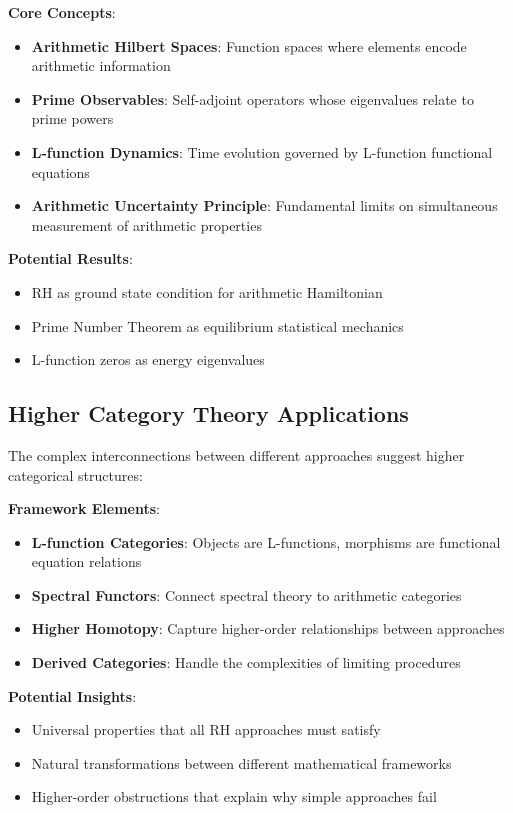 \begin{framework}
\textbf{Core Concepts}:
\begin{itemize}
\item \textbf{Arithmetic Hilbert Spaces}: Function spaces where elements encode arithmetic information
\item \textbf{Prime Observables}: Self-adjoint operators whose eigenvalues relate to prime powers
\item \textbf{L-function Dynamics}: Time evolution governed by L-function functional equations
\item \textbf{Arithmetic Uncertainty Principle}: Fundamental limits on simultaneous measurement of arithmetic properties
\end{itemize}

\textbf{Potential Results}:
\begin{itemize}
\item RH as ground state condition for arithmetic Hamiltonian
\item Prime Number Theorem as equilibrium statistical mechanics
\item L-function zeros as energy eigenvalues
\end{itemize}
\end{framework}

\subsection{Higher Category Theory Applications}
\label{subsec:higher_category}

The complex interconnections between different approaches suggest higher categorical structures:

\begin{research_direction}
\textbf{Framework Elements}:
\begin{itemize}
\item \textbf{L-function Categories}: Objects are L-functions, morphisms are functional equation relations
\item \textbf{Spectral Functors}: Connect spectral theory to arithmetic categories
\item \textbf{Higher Homotopy}: Capture higher-order relationships between approaches
\item \textbf{Derived Categories}: Handle the complexities of limiting procedures
\end{itemize}

\textbf{Potential Insights}:
\begin{itemize}
\item Universal properties that all RH approaches must satisfy
\item Natural transformations between different mathematical frameworks
\item Higher-order obstructions that explain why simple approaches fail
\end{itemize}
\end{research_direction}


